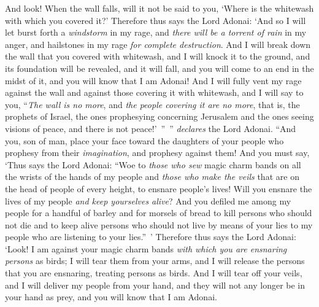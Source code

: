 \begin{biblechapter}
\verse And look! When the wall falls, will it not be said to you, ‘Where is the whitewash with which you covered it?’
\verse Therefore thus says the Lord Adonai: ‘And so I will let burst forth a \textit{windstorm} in my rage, and \textit{there will be a torrent of rain} in my anger, and hailstones in my rage \textit{for complete destruction}.
\verse And I will break down the wall that you covered with whitewash, and I will knock it to the ground, and its foundation will be revealed, and it will fall, and you will come to an end in the midst of it, and you will know that I am Adonai!
\verse And I will fully vent my rage against the wall and against those covering it with whitewash, and I will say to you, “\textit{The wall is no more}, and \textit{the people covering it are no more},
\verse that is, the prophets of Israel, the ones prophesying concerning Jerusalem and the ones seeing visions of peace, and there is not peace!’ ” ” \textit{declares} the Lord Adonai.
\verse “And you, son of man, place your face toward the daughters of your people who prophesy from their \textit{imagination}, and prophesy against them!
\verse And you must say, ‘Thus says the Lord Adonai: “Woe to \textit{those who sew} magic charm bands on all the wrists of the hands of my people and \textit{those who make the veils} that are on the head of people of every height, to ensnare people’s lives! Will you ensnare the lives of my people \textit{and keep yourselves alive}?
\verse And you defiled me among my people for a handful of barley and for morsels of bread to kill persons who should not die and to keep alive persons who should not live by means of your lies to my people who are listening to your lies.” ’
\verse Therefore thus says the Lord Adonai: ‘Look! I am against your magic charm bands \textit{with which you are ensnaring persons} as birds; I will tear them from your arms, and I will release the persons that you are ensnaring, treating persons as birds.
\verse And I will tear off your veils, and I will deliver my people from your hand, and they will not any longer be in your hand as prey, and you will know that I am Adonai.

\end{biblechapter}
